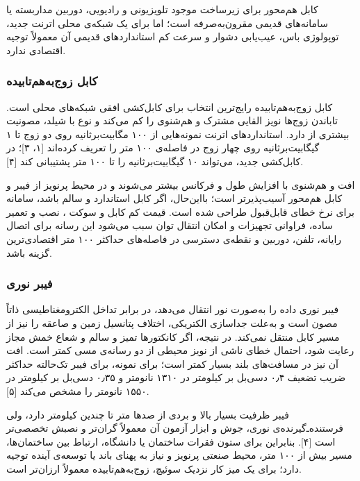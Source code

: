 کابل هم‌محور برای زیرساخت موجود تلویزیونی و رادیویی، دوربین مداربسته یا سامانه‌های قدیمی مقرون‌به‌صرفه است؛
اما برای یک شبکه‌ی محلی اترنت جدید، توپولوژی باس، عیب‌یابی دشوار و سرعت کم استانداردهای قدیمی آن معمولاً توجیه اقتصادی ندارد.

\subsubsection{کابل زوج‌به‌هم‌تابیده}

کابل زوج‌به‌هم‌تابیده رایج‌ترین انتخاب برای کابل‌کشی افقی شبکه‌های محلی است.
تاباندن زوج‌ها نویز القایی مشترک و هم‌شنوی را کم می‌کند و نوع  با شیلد، مصونیت بیشتری از  دارد.
استانداردهای اترنت نمونه‌هایی از ۱۰۰ مگابیت‌برثانیه روی دو زوج  تا ۱ گیگابیت‌برثانیه روی چهار زوج  در فاصله‌ی ۱۰۰ متر را تعریف کرده‌اند [۱، ۳]؛
در کابل‌کشی جدید،  می‌تواند ۱۰ گیگابیت‌برثانیه را تا ۱۰۰ متر پشتیبانی کند [۴].

افت و هم‌شنوی با افزایش طول و فرکانس بیشتر می‌شوند و  در محیط پرنویز از فیبر و کابل هم‌محور آسیب‌پذیرتر است؛
بااین‌حال، اگر کابل استاندارد و سالم باشد، سامانه برای نرخ خطای قابل‌قبول طراحی شده است.
قیمت کم کابل و سوکت ، نصب و تعمیر ساده، فراوانی تجهیزات و امکان انتقال توان  سبب می‌شود این رسانه برای اتصال رایانه، تلفن، دوربین و نقطه‌ی دسترسی در فاصله‌های حداکثر ۱۰۰ متر اقتصادی‌ترین گزینه باشد.

\subsubsection{فیبر نوری}

فیبر نوری داده را به‌صورت نور انتقال می‌دهد، در برابر تداخل الکترومغناطیسی ذاتاً مصون است و به‌علت جداسازی الکتریکی، اختلاف پتانسیل زمین و صاعقه را نیز از مسیر کابل منتقل نمی‌کند.
در نتیجه، اگر کانکتورها تمیز و سالم و شعاع خمش مجاز رعایت شود، احتمال خطای ناشی از نویز محیطی از دو رسانه‌ی مسی کمتر است.
افت آن نیز در مسافت‌های بلند بسیار کمتر است؛ برای نمونه،  برای فیبر تک‌حالته حداکثر ضریب تضعیف ۰٫۴ دسی‌بل بر کیلومتر در ۱۳۱۰ نانومتر و ۰٫۳۵ دسی‌بل بر کیلومتر در ۱۵۵۰ نانومتر را مشخص می‌کند [۵].

فیبر ظرفیت بسیار بالا و بردی از صدها متر تا چندین کیلومتر دارد، ولی فرستنده‌ـ‌گیرنده‌ی نوری، جوش و ابزار آزمون آن معمولاً گران‌تر و نصبش تخصصی‌تر است [۴].
بنابراین برای ستون فقرات ساختمان یا دانشگاه، ارتباط بین ساختمان‌ها، مسیر بیش از ۱۰۰ متر، محیط صنعتی پرنویز و نیاز به پهنای باند یا توسعه‌ی آینده توجیه دارد؛
برای یک میز کار نزدیک سوئیچ، زوج‌به‌هم‌تابیده معمولاً ارزان‌تر است.

